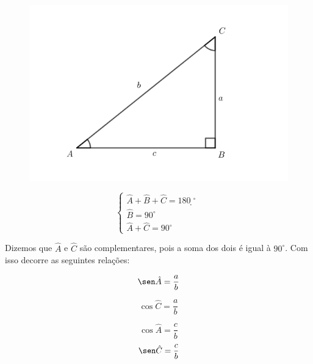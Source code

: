 \begin{figure}[H]
	\centering
	
	\includegraphics[scale=3.5]{imagens/triangulo-retangulo.png}

\end{figure}


$$
\begin{cases}
\hat{A} + \hat{B} + \hat{C} = 180̣^{\circ}\\
\hat{B} = 90^{\circ}\\
\hat{A} + \hat{C} = 90^{\circ}
\end{cases}
$$

Dizemos que $\hat{A} $ e $ \hat{C} $ são complementares, pois a soma dos dois é igual à $90^{\circ}$. Com isso decorre as seguintes relações:

$$\sen\hat{A} = \dfrac{a}{b}$$

$$\cos\hat{C} = \dfrac{a}{b}$$
\centering
{}



$$\cos\hat{A} = \dfrac{c}{b}$$
$$\sen\hat{C} = \dfrac{c}{b}$$
\centering
{}

\newpage









